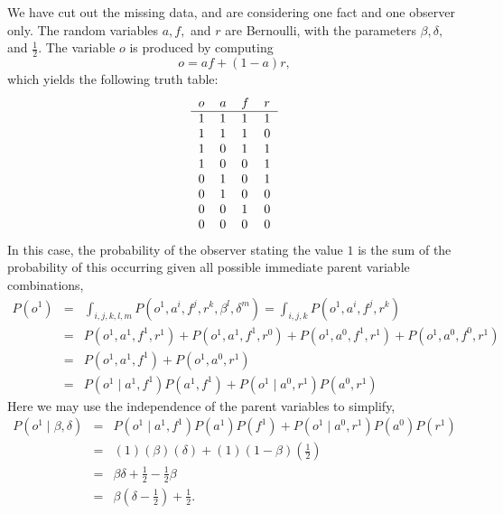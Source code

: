 \documentclass{amsart}
\theoremstyle{definition}
\theoremstyle{plain}
\numberwithin{equation}{section}
\begin{document}
We have cut out the missing data, and are considering one fact and one
observer only. The random variables $a,f,$ and $r$ are Bernoulli, with the
parameters $\beta ,\delta ,$ and $\frac{1}{2}$. The variable $o$ is produced
by computing%
\begin{equation*}
o=af+\left( 1-a\right) r,
\end{equation*}%
which yields the following truth table:%
\begin{equation*}
\begin{tabular}{llll}
$o$ & $a$ & $f$ & $r$ \\ \hline
$1$ & $1$ & $1$ & $1$ \\ 
$1$ & $1$ & $1$ & $0$ \\ 
$1$ & $0$ & $1$ & $1$ \\ 
$1$ & $0$ & $0$ & $1$ \\ 
$0$ & $1$ & $0$ & $1$ \\ 
$0$ & $1$ & $0$ & $0$ \\ 
$0$ & $0$ & $1$ & $0$ \\ 
$0$ & $0$ & $0$ & $0$%
\end{tabular}%
\end{equation*}%
In this case, the probability of the observer stating the value $1$ is the
sum of the probability of this occurring given all possible immediate parent
variable combinations, 
\begin{eqnarray*}
P\left( o^{1}\right)  &=&\int_{i,j,k,l,m}P\left(
o^{1},a^{i},f^{j},r^{k},\beta ^{l},\delta ^{m}\right) =\int_{i,j,k}P\left(
o^{1},a^{i},f^{j},r^{k}\right)  \\
&=&P\left( o^{1},a^{1},f^{1},r^{1}\right) +P\left(
o^{1},a^{1},f^{1},r^{0}\right) +P\left( o^{1},a^{0},f^{1},r^{1}\right)
+P\left( o^{1},a^{0},f^{0},r^{1}\right)  \\
&=&P\left( o^{1},a^{1},f^{1}\right) +P\left( o^{1},a^{0},r^{1}\right)  \\
&=&P\left( o^{1}\mid a^{1},f^{1}\right) P\left( a^{1},f^{1}\right) +P\left(
o^{1}\mid a^{0},r^{1}\right) P\left( a^{0},r^{1}\right) 
\end{eqnarray*}%
Here we may use the independence of the parent variables to simplify,%
\begin{eqnarray*}
P\left( o^{1}\mid \beta ,\delta \right)  &=&P\left( o^{1}\mid
a^{1},f^{1}\right) P\left( a^{1}\right) P\left( f^{1}\right) +P\left(
o^{1}\mid a^{0},r^{1}\right) P\left( a^{0}\right) P\left( r^{1}\right)  \\
&=&\left( 1\right) \left( \beta \right) \left( \delta \right) +\left(
1\right) \left( 1-\beta \right) \left( \frac{1}{2}\right)  \\
&=&\beta \delta +\frac{1}{2}-\frac{1}{2}\beta  \\
&=&\beta \left( \delta -\frac{1}{2}\right) +\frac{1}{2}.
\end{eqnarray*}%
\end{document}
